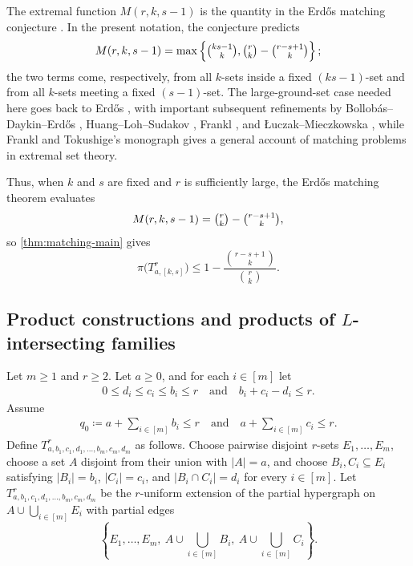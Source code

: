 \documentclass[10pt,a4paper]{article}
\theoremstyle{plain}
\theoremstyle{definition}
\theoremstyle{plain}
\begin{document}
The extremal function $M(r,k,s-1)$ is the quantity in the Erd\H{o}s matching conjecture \cite{ErdosMatching65}.  In the present notation, the conjecture predicts
\[
        M(r,k,s-1)
        =
        \max\left\{\tbinom{ks-1}{k},
        \tbinom{r}{k}-\tbinom{r-s+1}{k}\right\};
\]
the two terms come, respectively, from all $k$-sets inside a fixed $(ks-1)$-set and from all $k$-sets meeting a fixed $(s-1)$-set.  The large-ground-set case needed here goes back to Erd\H{o}s \cite{ErdosMatching65}, with important subsequent refinements by Bollob\'as--Daykin--Erd\H{o}s \cite{BollobasDaykinErdos76}, Huang--Loh--Sudakov \cite{HuangLohSudakov12}, Frankl \cite{Frankl13Matching}, and {\L}uczak--Mieczkowska \cite{LuczakMieczkowska14}, while Frankl and Tokushige's monograph \cite{FranklTokushige18} gives a general account of matching problems in extremal set theory.

Thus, when $k$ and $s$ are fixed and $r$ is sufficiently large, the Erd\H{o}s matching theorem evaluates
\[
        M(r,k,s-1)=\tbinom{r}{k}-\tbinom{r-s+1}{k},
\]
so \cref{thm:matching-main} gives
\[
        \pi\bigl(T^r_{a,[k,s]}\bigr)
        \le
        1-\frac{\binom{r-s+1}{k}}{\binom{r}{k}}.
\]

\subsection{Product constructions and products of \texorpdfstring{$L$}{L}-intersecting families}

Let $m\ge1$ and $r\ge2$.  Let $a\ge0$, and for each $i\in[m]$ let
\begin{equation}\label{eq:product-coordinate-assumptions}
\begin{gathered}
        0\le d_i\le c_i\le b_i\le r
        \quad\text{and}\quad b_i+c_i-d_i\le r.
\end{gathered}
\end{equation}
Assume
\begin{equation}\label{eq:product-size-assumptions}
\begin{gathered}
        q_0\coloneqq a+\sum_{i\in [m]} b_i\le r
        \quad\text{and}\quad
        a+\sum_{i\in [m]} c_i\le r.
\end{gathered}
\end{equation}
Define $T^r_{a,b_1,c_1,d_1,\ldots,b_m,c_m,d_m}$ as follows.  Choose pairwise disjoint $r$-sets $E_1,\ldots,E_m$, choose a set $A$ disjoint from their union with $|A|=a$, and choose $B_i,C_i\subseteq E_i$ satisfying $|B_i|=b_i$, $|C_i|=c_i$, and $|B_i\cap C_i|=d_i$ for every $i\in[m]$.  Let $T^r_{a,b_1,c_1,d_1,\ldots,b_m,c_m,d_m}$ be the $r$-uniform extension of the partial hypergraph on $A\cup\bigcup_{i\in [m]} E_i$ with partial edges
\[
        \left\{E_1,\ldots,E_m,~
        A\cup\bigcup_{i\in [m]} B_i,~
        A\cup\bigcup_{i\in [m]} C_i\right\}.
\]
\end{document}
